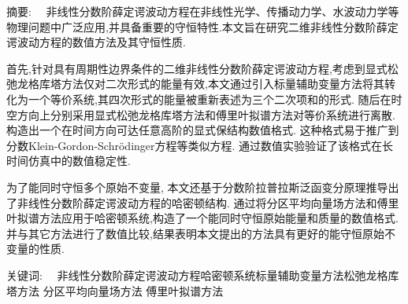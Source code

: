 
\begin{ChineseAbstract}[副教授]%
\item {\heiti 摘要:\ \ }
非线性分数阶薛定谔波动方程在非线性光学、传播动力学、水波动力学等物理问题中广泛应用,并具备重要的守恒特性.本文旨在研究二维非线性分数阶薛定谔波动方程的数值方法及其守恒性质.

首先,针对具有周期性边界条件的二维非线性分数阶薛定谔波动方程,考虑到显式松弛龙格库塔方法仅对二次形式的能量有效,本文通过引入标量辅助变量方法将其转化为一个等价系统,其四次形式的能量被重新表述为三个二次项和的形式.
随后在时空方向上分别采用显式松弛龙格库塔方法和傅里叶拟谱方法对等价系统进行离散. 构造出一个在时间方向可达任意高阶的显式保结构数值格式.
这种格式易于推广到分数Klein-Gordon-Schr{\"o}dinger方程等类似方程.
通过数值实验验证了该格式在长时间仿真中的数值稳定性.

为了能同时守恒多个原始不变量, 本文还基于分数阶拉普拉斯泛函变分原理推导出了非线性分数阶薛定谔波动方程的哈密顿结构.
通过将分区平均向量场方法和傅里叶拟谱方法应用于哈密顿系统,构造了一个能同时守恒原始能量和质量的数值格式.
并与其它方法进行了数值比较,结果表明本文提出的方法具有更好的能守恒原始不变量的性质.

\item {\heiti 关键词:\ \ } 非线性分数阶薛定谔波动方程\qquad 哈密顿系统\qquad 标量辅助变量方法\qquad 松弛龙格库塔方法 \qquad 分区平均向量场方法 \qquad 傅里叶拟谱方法
\end{ChineseAbstract}
